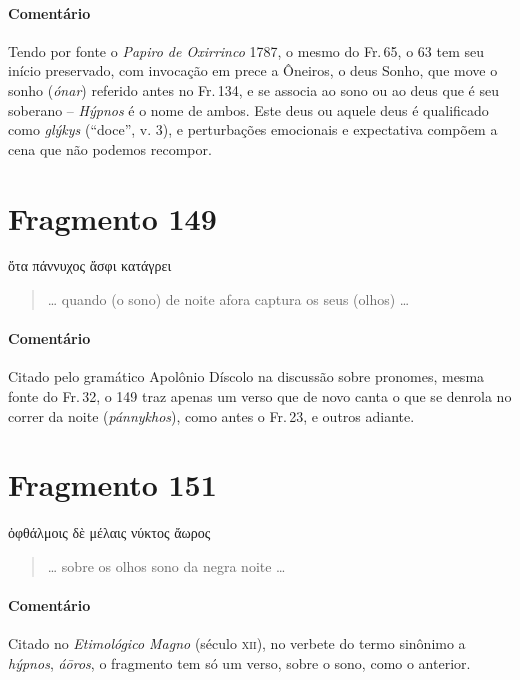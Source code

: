 {\paragraph{Comentário} Tendo por fonte o \textit{Papiro de Oxirrinco} 1787, o mesmo do Fr.\,65, o 63 tem seu início preservado, com invocação em prece a Ôneiros, o deus Sonho, que move o sonho (\textit{ónar}) referido antes no Fr.\,134, e se associa ao sono ou ao deus que é seu soberano -- \textit{Hýpnos} é o nome de ambos. Este deus ou aquele deus é qualificado como \textit{glýkys} (``doce'', v. 3), e perturbações emocionais e expectativa compõem a cena que não podemos recompor.}



\pagebreak
\section{Fragmento 149}

\begin{gkverse}
ὄτα πάννυχος ἄσφι κατάγρει
\end{gkverse}

\begin{verse}
\ldots{} quando (o sono) de noite afora captura os seus (olhos) \ldots{}
\end{verse}

{\paragraph{Comentário} Citado pelo gramático Apolônio Díscolo na discussão sobre pronomes, mesma fonte do Fr.\,32, o 149 traz apenas um verso que de novo canta o que se denrola no correr da noite (\textit{pánnykhos}), como antes o Fr.\,23, e outros adiante.}


\section{Fragmento 151}

\begin{gkverse}
ὀφθάλμοις δὲ μέλαις νύκτος ἄωρος
\end{gkverse}

\begin{verse}
\ldots{} sobre os olhos sono da negra noite \ldots{}
\end{verse}

 {\paragraph{Comentário} Citado no \textit{Etimológico Magno} (século \textsc{xii}), no verbete do termo sinônimo a \textit{hýpnos}, \textit{áōros}, o fragmento tem só um verso, sobre o sono, como o anterior.}


